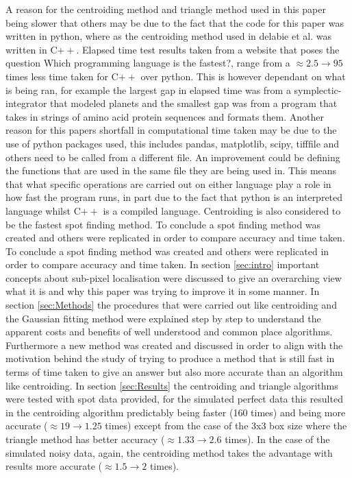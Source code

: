   A reason for the centroiding method and triangle method used in this paper being slower that others may 
  be due to the fact that the code for this paper was written in python, where as the centroiding method used in 
  delabie et al. was written in C$++$. Elapsed time test results taken from a website that poses the question 
  Which programming language is the fastest?\cite{bagley}, range from a $\approx 2.5\rightarrow 95$ times 
  less time taken for C$++$ over python. This is however dependant on what is being ran, for example the largest 
  gap in elapsed time was from a symplectic-integrator that modeled planets and the smallest gap was from a program 
  that takes in strings of amino acid protein sequences and formats them.   Another reason for this papers shortfall in computational time taken may be due to the use of python 
  packages used, this includes pandas, matplotlib, scipy, tifffile and others need to be called from 
  a different file. An improvement could be defining the functions that are used in the same file they are 
  being used in. This means that what specific operations 
  are carried out on either language play a role in how fast the program runs, in part due to the fact that 
  python is an interpreted language whilst C$++$ is a compiled language. Centroiding is also 
  considered to be the fastest spot finding method.\cite{delabie2014accurate}  To conclude a spot finding method was created and others were replicated in order to compare 
  accuracy and time taken.   To conclude a spot finding method was created and others were replicated in order to compare 
  accuracy and time taken. In section \ref{sec:intro} important concepts about sub-pixel localisation 
  were discussed to give an overarching view what it is and why this paper was trying to improve it 
  in some manner. In section \ref{sec:Methods} the procedures that were carried out like centroiding 
  and the Gaussian fitting method were explained step by step to understand the apparent costs and benefits 
  of well understood and common place algorithms. Furthermore a new method was created and discussed in order 
  to align with the motivation behind the study of trying to produce a method that is still fast in terms 
  of time taken to give an answer but also more accurate than an algorithm like centroiding. In section \ref{sec:Results}
  the centroiding and triangle algorithms were tested with spot data provided, for the simulated perfect data this resulted 
  in the centroiding algorithm predictably being faster (160 times) and being more accurate ($\approx 19\rightarrow 1.25$ times) 
  except from the case of the 3x3 box size where the triangle method has better accuracy ($\approx 1.33\rightarrow 2.6$ times).
  In the case of the simulated noisy data, again, the centroiding method takes the advantage with results more 
  accurate ($\approx 1.5\rightarrow 2$ times).

